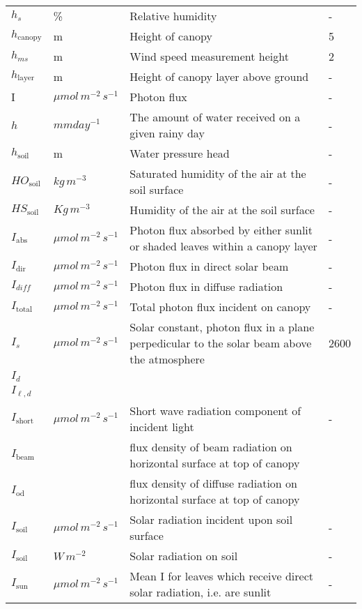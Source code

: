 \documentclass[10pt]{article}
\renewcommand{\marginnote}[2][]{}
\begin{document}
\begin{center}
\begin{longtable}{l l p{3in} p{0.5in}}
$h_s$	&	\%	&	Relative humidity	&	-	\\
$h_{\text{canopy}}$	&	m	&	Height of canopy	&	5	\\
$h_{ms}$	&	m	&	Wind speed measurement height	&	2	\\
$h_{\text{layer}}$	&	m	&	Height of canopy layer above ground	&	-	\\
	I&	$\mu mol\, m^{-2}\, s^{-1}$ 	&	Photon flux	&	-	\\
$h$	&	$mm day^{-1}$	&	The amount of water received on a given rainy day	&	-	\\
$h_{\text{soil}}$	&	m	&	Water pressure head	&	-	\\
$HO_{\text{soil}}$	&	$kg\,m^{-3}$	&	Saturated humidity of the air at the soil surface	&	-	\\
$HS_{\text{soil}}$	&	$Kg\, m^{-3}$	&	Humidity of the air at the soil surface	&	-	\\
$I_{\text{abs}}$	&	$\mu mol\, m^{-2}\, s^{-1}$ 	&	Photon flux absorbed by either sunlit or shaded leaves within a canopy layer	&	-	\\
$I_{\text{dir}}$	&	$\mu mol\, m^{-2}\, s^{-1}$ 	&	Photon flux in direct solar beam	&	-	\\
$I_{\mathit{\text{diff}}}$	&	$\mu mol\,m^{-2}\, s^{-1}$ 	&	Photon flux in diffuse radiation	&	-	\\
$I_{\text{total}}$	&	$\mu mol\, m^{-2}\, s^{-1}$ 	&	Total photon flux incident on canopy	&	-	\\
$I_s$	&	$\mu mol\, m^{-2}\, s^{-1}$ 	&	Solar constant, photon flux in a plane perpedicular to the solar beam above the atmosphere	&	2600	\\
$I_d$ & & & \marginnote{undefined}\\
$I_{\ell,d}$ & & & \marginnote{undefined}\\
$I_{\text{short}}$	&	$\mu mol\, m^{-2}\, s^{-1}$ 	&	Short wave radiation component of incident light	&	-	\\
$I_\text{beam}$ & & flux density of beam radiation on horizontal surface at top of canopy & \\
$I_\text{od}$ & & flux density of diffuse radiation on horizontal surface at top of canopy & \\
$I_{\text{soil}}$	&	$\mu mol\, m^{-2}\, s^{-1}$ 	&	Solar radiation incident upon soil surface	&	-	\\
$I_\text{soil}$	&	$W\, m^{-2}$	&	Solar radiation on soil	&	-	\marginnote{which units for $I_\text{soil}$ are correct?}\\
$I_\text{sun}$	&	$\mu mol\, m^{-2}\, s^{-1}$ 	&	Mean I for leaves which receive direct solar radiation, i.e. are sunlit	&	-	\\

\end{longtable}
\end{center}
\end{document}
